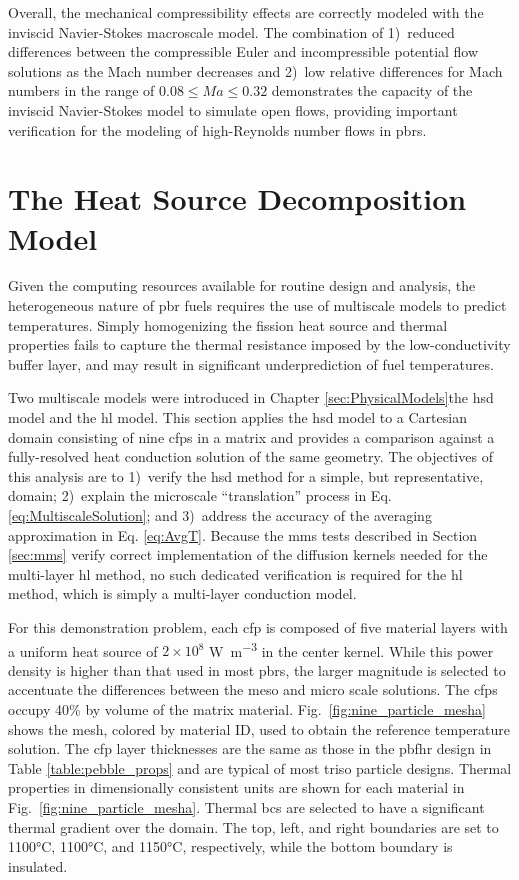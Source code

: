 Overall, the mechanical compressibility effects are correctly modeled with the inviscid Navier-Stokes macroscale model. The combination of 1)~reduced differences between the compressible Euler and incompressible potential flow solutions as the Mach number decreases and 2)~low relative differences for Mach numbers in the range of \(0.08\leq Ma\leq0.32\) demonstrates the capacity of the inviscid Navier-Stokes model to simulate open flows, providing important verification for the modeling of high-Reynolds number flows in \glspl{pbr}.

\section{The Heat Source Decomposition Model}
\label{sec:verification_meso}

Given the computing resources available for routine design and analysis, the heterogeneous nature of \gls{pbr} fuels requires the use of multiscale models to predict temperatures. Simply homogenizing the fission heat source and thermal properties fails to capture the thermal resistance imposed by the low-conductivity buffer layer, and may result in significant underprediction of fuel temperatures. 

Two multiscale models were introduced in Chapter \ref{sec:PhysicalModels}\mdash the \gls{hsd} model and the \gls{hl} model. This section applies the \gls{hsd} model to a Cartesian domain consisting of nine \glspl{cfp} in a matrix and provides a comparison against a fully-resolved heat conduction solution of the same geometry. The objectives of this analysis are to 1)~verify the \gls{hsd} method for a simple, but representative, domain; 2)~explain the microscale ``translation'' process in Eq. \eqref{eq:MultiscaleSolution}; and 3)~address the accuracy of the averaging approximation in Eq. \eqref{eq:AvgT}. Because the \gls{mms} tests described in Section \ref{sec:mms} verify correct implementation of the diffusion kernels needed for the multi-layer \gls{hl} method, no such dedicated verification is required for the \gls{hl} method, which is simply a multi-layer conduction model.

For this demonstration problem, each \gls{cfp} is composed of five material layers with a uniform heat source of \(2\times10^8\) \si{\watt\per\cubic\meter} in the center kernel. While this power density is higher than that used in most \glspl{pbr}, the larger magnitude is selected to accentuate the differences between the meso and micro scale solutions. The \glspl{cfp} occupy 40\% by volume of the matrix material. Fig.\ \ref{fig:nine_particle_mesha} shows the mesh, colored by material ID, used to obtain the reference temperature solution. The \gls{cfp} layer thicknesses are the same as those in the \gls{pbfhr} design in Table \ref{table:pebble_props} and are typical of most \gls{triso} particle designs. Thermal properties in dimensionally consistent units are shown for each material in Fig.\ \ref{fig:nine_particle_mesha}. Thermal \glspl{bc} are selected to have a significant thermal gradient over the domain. The top, left, and right boundaries are set to 1100\si{\celsius}, 1100\si{\celsius}, and 1150\si{\celsius}, respectively, while the bottom boundary is insulated.

